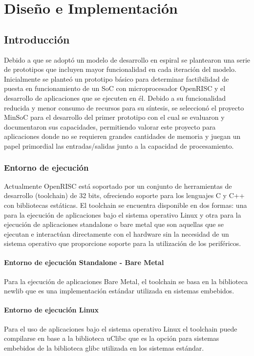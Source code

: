 \chapter{Diseño e Implementación}\label{chap:disenoeimpl}

	\section{Introducción}

	Debido a que se adoptó un modelo de desarrollo en espiral se plantearon una serie de prototipos que incluyen mayor funcionalidad en cada iteración
	del modelo. Inicialmente se planteó un prototipo básico para determinar factibilidad de puesta en funcionamiento de un SoC con microprocesador
	OpenRISC y el desarrollo de aplicaciones que se ejecuten en él. Debido a su funcionalidad reducida y menor consumo de recursos  para su síntesis, se
	seleccionó el proyecto MinSoC para el desarrollo del primer prototipo con el cual se evaluaron y documentaron sus capacidades, permitiendo
	valorar este proyecto para aplicaciones donde no se requieren grandes cantidades de memoria y juegan un papel primordial las entradas/salidas junto
	a la capacidad de procesamiento.  \\
		 
		\subsection{Entorno de ejecución}
		Actualmente OpenRISC está soportado por un conjunto de herramientas de desarrollo (toolchain) de 32 bits, ofreciendo soporte para los lenguajes C y C++
		con bibliotecas estáticas. El toolchain se encuentra disponible en dos formas: una para la ejecución de aplicaciones bajo el sistema operativo Linux y
		otra para la ejecución de aplicaciones standalone o bare metal que son aquellas que se ejecutan e interactúan directamente con el hardware sin la
		necesidad de un sistema operativo que proporcione soporte para la utilización de los periféricos.
		
			\subsubsection{Entorno de ejecución Standalone - Bare Metal}
	    	Para la ejecución de aplicaciones Bare Metal, el toolchain se basa en la biblioteca newlib que es una implementación estándar utilizada en
	    	sistemas embebidos. 
	    
			\subsubsection{Entorno de ejecución Linux}
			Para el uso de aplicaciones bajo el sistema operativo Linux el toolchain puede compilarse en base a la biblioteca uClibc que es la
			opción para sistemas embebidos de la biblioteca glibc utilizada en los sistemas estándar.


